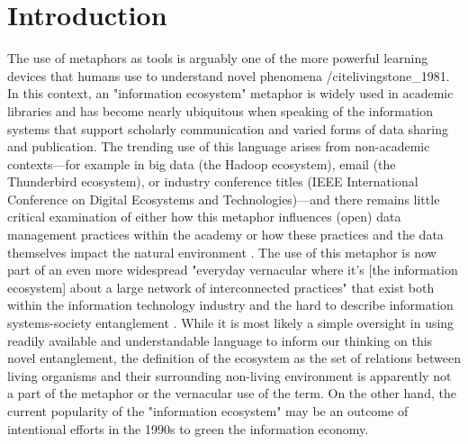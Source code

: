 \section{Introduction}

The use of metaphors as tools is arguably one of the more powerful learning devices that humans use to understand novel phenomena /cite{livingstone_1981}. In this context, an "information ecosystem" metaphor is widely used in academic libraries and has become nearly ubiquitous when speaking of the information systems that support scholarly communication and varied forms of data sharing and publication. The trending use of this language arises from non-academic contexts—for example in big data (the Hadoop ecosystem), email (the Thunderbird ecosystem), or industry conference titles (IEEE International Conference on Digital Ecosystems and Technologies)—and there remains little critical examination of either how this metaphor influences (open) data management practices within the academy or how these practices and the data themselves impact the natural environment \cite[although for contributions from human ecology see][]{stepp_1999}. The use of this metaphor is now part of an even more widespread "everyday vernacular where it’s [the information ecosystem] about a large network of interconnected practices" that exist both within the information technology industry and the hard to describe information systems-society entanglement \cite{boyd_2016}. While it is most likely a simple oversight in using readily available and understandable language to inform our thinking on this novel entanglement, the definition of the ecosystem as the set of relations between living organisms and their surrounding non-living environment is apparently not a part of the metaphor or the vernacular use of the term. On the other hand, the current popularity of the "information ecosystem" may be an outcome of intentional efforts in the 1990s to green the information economy.

